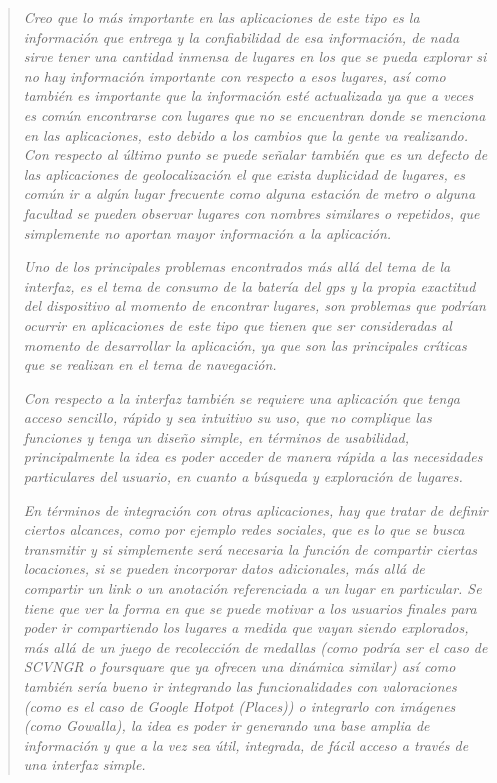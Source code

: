 \documentclass[10pt,letterpaper]{article}
\begin{document}
\begin{quote}
\textit{Creo que lo más importante en las aplicaciones de este tipo es la información que entrega y la confiabilidad de esa información, de nada sirve tener una cantidad inmensa de lugares en los que se pueda explorar si no hay información importante con respecto a esos lugares, así como también es importante que la información esté actualizada ya que a veces es común encontrarse con lugares que no se encuentran donde se menciona en las aplicaciones, esto debido a los cambios que la gente va realizando. Con respecto al último punto se puede señalar también que es un defecto de las aplicaciones de geolocalización el que exista duplicidad de lugares, es común ir a algún lugar frecuente como alguna estación de metro o alguna facultad se pueden observar lugares con nombres similares o repetidos, que simplemente no aportan mayor información a la aplicación.\\}

\textit{Uno de los principales problemas encontrados más allá del tema de la interfaz, es el tema de consumo de la batería del gps y la propia exactitud del dispositivo al momento de encontrar lugares, son problemas que podrían ocurrir en aplicaciones de este tipo que tienen que ser consideradas al momento de desarrollar la aplicación, ya que son las principales críticas que se realizan en el tema de navegación.\\}

\textit{Con respecto a la interfaz también se requiere una aplicación que tenga acceso sencillo, rápido y sea intuitivo su uso, que no complique las funciones y tenga un diseño simple, en términos de usabilidad, principalmente la idea es poder acceder de manera rápida a las necesidades particulares del usuario, en cuanto a búsqueda y exploración de lugares.\\}

\textit{En términos de integración con otras aplicaciones, hay que tratar de definir ciertos alcances, como por ejemplo redes sociales, que es lo que se busca transmitir y si simplemente será necesaria la función de compartir ciertas locaciones, si se pueden incorporar datos adicionales, más allá de compartir un link o un anotación referenciada a un lugar en particular. Se tiene que ver la forma en que se puede motivar a los usuarios finales para poder ir compartiendo los lugares a medida que vayan siendo explorados, más allá de un juego de recolección de medallas (como podría ser el caso de SCVNGR o foursquare que ya ofrecen una dinámica similar) así como también sería bueno ir integrando las funcionalidades con valoraciones (como es el caso de Google Hotpot (Places)) o integrarlo con imágenes (como Gowalla), la idea es poder ir generando una base amplia de información y que a la vez sea útil, integrada, de fácil acceso a través de una interfaz simple.\\}


\end{quote}
\end{document}
